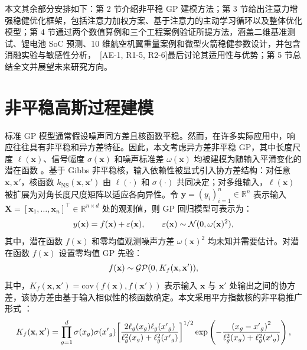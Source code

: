 \documentclass[]{interact}
\DeclareRobustCommand{\reviewadd}[2]{{\color{red}#1}\ {\color{blue}\footnotesize[#2]}}
\theoremstyle{plain}%
\theoremstyle{definition}
\theoremstyle{remark}
\begin{document}
本文其余部分安排如下：第 2 节介绍非平稳 GP 建模方法；第 3 节给出注意力增强稳健优化框架，包括注意力加权方案、基于注意力的主动学习循环以及整体优化模型；第 4 节\reviewadd{通过两个数值算例和三个工程案例验证所提方法，涵盖二维基准测试、锂电池 SoC 预测、10 维航空机翼重量案例和微型火箭稳健参数设计，并包含消融实验与敏感性分析，}{AE-1, R1-5, R2-6}最后讨论其适用性与优势；第 5 节总结全文并展望未来研究方向。

\section{非平稳高斯过程建模}

标准 GP 模型通常假设噪声同方差且核函数平稳。然而，在许多实际应用中，响应往往具有非平稳和异方差特征。因此，本文考虑异方差非平稳 GP，其中长度尺度 $\ell(\mathbf{x})$、信号幅度 $\sigma(\mathbf{x})$ 和噪声标准差 $\omega(\mathbf{x})$ 均被建模为随输入平滑变化的潜在函数 \citep{Heinonen2016, Rhode2020}。基于 Gibbs 非平稳核，输入依赖性被显式引入协方差结构：对任意 $\mathbf{x}, \mathbf{x}'$，核函数 $k_{\mathrm{NS}}(\mathbf{x},\mathbf{x}')$ 由 $\ell(\cdot)$ 和 $\sigma(\cdot)$ 共同决定；对多维输入，$\ell(\mathbf{x})$ 被扩展为对角长度尺度矩阵以适应各向异性。令 $\mathbf{y} = (y_i)_{i=1}^n \in \mathbb{R}^n$ 表示输入 $\mathbf{X} = [\mathbf{x}_1, \ldots, \mathbf{x}_n]^\top \in \mathbb{R}^{n\times d}$ 处的观测值，则 GP 回归模型可表示为：
\begin{equation}
	y({\bf{x}}) = f({\bf{x}}) + \varepsilon ({\bf{x}}),\qquad \varepsilon ({\bf{x}})\sim{\cal N}(0,\omega {({\bf{x}})^2}),
\end{equation}
其中，潜在函数 $f(\mathbf{x})$ 和零均值观测噪声方差 $\omega(\mathbf{x})^{2}$ 均未知并需要估计。对潜在函数 $f(\mathbf{x})$ 设置零均值 GP 先验：
\begin{equation}
	f({\bf{x}})\sim{\cal G}{\cal P}(0,{\mkern 1mu} {K_f}({\bf{x}},{\bf{x'}})),
\end{equation}
其中，$K_{f}(\mathbf{x},\mathbf{x}') = \mathrm{cov}(f(\mathbf{x}), f(\mathbf{x}'))$ 表示输入 $\mathbf{x}$ 与 $\mathbf{x}'$ 处输出之间的协方差，该协方差由基于输入相似性的核函数确定。本文采用平方指数核的非平稳推广形式 \citep{Heinonen2016}：
\begin{equation}
	{K_f}({\bf{x}},{\bf{x'}}) = \prod\limits_{g = 1}^d {\sigma ({x_g})\sigma ({{x'}_g}){{\left[ {\frac{{2{\ell _g}({x_g}){\ell _g}({{x'}_g})}}{{\ell _g^2({x_g}) + \ell _g^2({{x'}_g})}}} \right]}^{1/2}}} \exp \left( { - \frac{{{{({x_g} - {{x'}_g})}^2}}}{{\ell _g^2({x_g}) + \ell _g^2({{x'}_g})}}} \right),
\end{equation}
\end{document}
